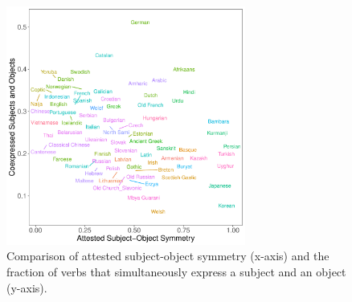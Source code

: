 \documentclass[11pt,a4paper]{article}
\begin{document}
\begin{figure}
    \centering
    \includegraphics[width=0.7\textwidth]{../analysis/figures/objects-order-pureud-byVerb_FORMAT.pdf}
    \caption{Comparison of attested subject-object symmetry (x-axis) and the fraction of verbs that simultaneously express a subject and an object (y-axis).}
    \label{fig:study2}
\end{figure}












\end{document}
